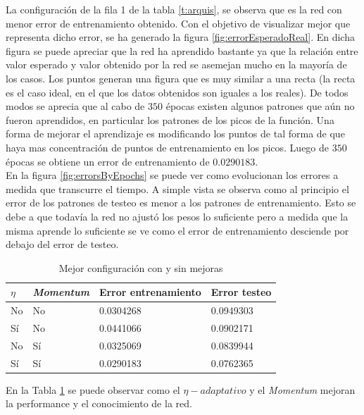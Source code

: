 \documentclass{sig-alternate}
\begin{document}
	La configuración de la fila 1 de la tabla \ref{t:arquis}, se observa que es la red con menor error de entrenamiento obtenido. Con el objetivo de visualizar mejor que representa dicho error, se ha generado la figura \ref{fig:errorEsperadoReal}. En dicha figura se puede apreciar que la red ha aprendido bastante ya que la relación entre valor esperado y valor obtenido por la red se asemejan mucho en la mayoría de los casos. Los puntos generan una figura que es muy similar a una recta (la recta es el caso ideal, en el que los datos obtenidos son iguales a los reales). De todos modos se aprecia que al cabo de $350$ épocas existen algunos patrones que aún no fueron aprendidos, en particular los patrones de los picos de la función. Una forma de mejorar el aprendizaje es modificando los puntos de tal forma de que haya mas concentración de puntos de entrenamiento en los picos. Luego de $350$ épocas se obtiene un error de entrenamiento de $0.0290183$.\\


	En la figura \ref{fig:errorsByEpochs} se puede ver como evolucionan los errores a medida que transcurre el tiempo. A simple vista se observa como al principio el error de los patrones de testeo es menor a los patrones de entrenamiento. Esto se debe a que todavía la red no ajustó los pesos lo suficiente pero a medida que la misma aprende lo suficiente se ve como el error de entrenamiento desciende por debajo del error de testeo.\\

	\begin{table}
		\begin{center}
			\begin{tabular}{ |p{0.5cm}|p{2cm}|p{2cm}|p{2cm}| }
				\hline
				$\eta$ & \textit{Momentum} & Error entrenamiento & Error testeo \\ \hline
				No & No & 0.0304268 & 0.0949303 \\ 
				\hline
				Sí & No & 0.0441066 & 0.0902171 \\
				\hline
				No & Sí & 0.0325069 & 0.0839944 \\
				\hline
				Sí & Sí &  0.0290183 & 0.0762365\\
				\hline
			\end{tabular}
			\caption{Mejor configuración con y sin mejoras}
			\label{t:bestConf}
		\end{center}
	\end{table}
	
	En la Tabla \ref{t:bestConf} se puede observar como el $\eta-adaptativo$ y el \textit{Momentum} mejoran la performance y el conocimiento de la red.
\end{document}
